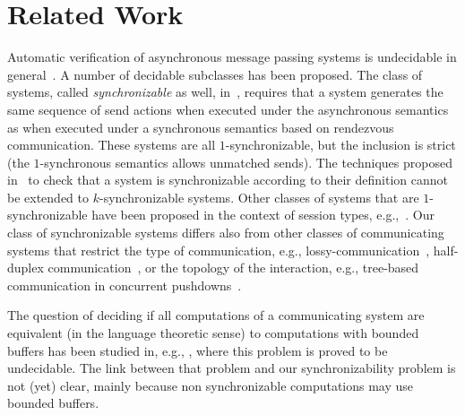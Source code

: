 \section{Related Work}\label{sec:related}

Automatic verification of asynchronous message passing systems is undecidable in general~\cite{DBLP:journals/jacm/BrandZ83}. 
A number of decidable subclasses has been proposed. 
The class of systems, called \emph{synchronizable} as well, in~\cite{DBLP:journals/tcs/BasuB16}, requires that a system generates the same sequence of send actions when executed under the asynchronous semantics as when executed under a synchronous semantics based on rendezvous communication. These systems are all $1$-synchronizable, but the inclusion is strict (the $1$-synchronous semantics allows unmatched sends). The techniques proposed in~\cite{DBLP:journals/tcs/BasuB16} to check that a system is synchronizable according to their definition cannot be extended to $k$-synchronizable systems.
Other classes of systems that are $1$-synchronizable have been proposed in the context of session types, e.g.,~\cite{DBLP:conf/esop/DenielouY12,DBLP:journals/jacm/HondaYC16,DBLP:conf/esop/HondaVK98,DBLP:conf/popl/LangeTY15}. 
Our class of synchronizable systems differs also from other classes of communicating systems that restrict the type of communication, e.g., lossy-communication~\cite{DBLP:journals/iandc/AbdullaJ96}, half-duplex communication~\cite{DBLP:journals/iandc/CeceF05}, or the topology of the interaction, e.g., tree-based communication in concurrent pushdowns~\cite{DBLP:conf/tacas/TorreMP08,DBLP:journals/corr/abs-1209-0359}.

The question of deciding if all computations of a communicating system are equivalent (in the language theoretic sense) to computations with bounded buffers has been studied in, e.g., \cite{DBLP:journals/fuin/GenestKM07}, where this problem is proved to be undecidable. The link between that problem and our synchronizability problem is not (yet) clear, mainly because non synchronizable computations may use bounded buffers.

